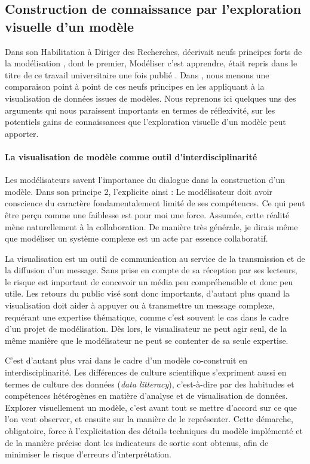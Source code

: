 \subsection{Construction de connaissance par l'exploration visuelle d'un modèle}

Dans son Habilitation à Diriger des Recherches,  décrivait neufs \og principes forts\fg{} de la modélisation \autocite[76--84]{banos_pour_2013}, dont le premier, \og Modéliser c'est apprendre\fg{}, était repris dans le titre de ce travail universitaire une fois publié \autocite{banos_modeliser_2016}.
Dans \textcite[\ppno~\hl{0--N}]{cura_visualisation_2020}, nous menons une comparaison point à point de ces neufs principes en les appliquant à la visualisation de données issues de modèles.
Nous reprenons ici quelques uns des arguments qui nous paraissent importants en termes de réflexivité, sur les potentiels gains de connaissances que l'exploration visuelle d'un modèle peut apporter.


\paragraph{La visualisation de modèle comme outil d'interdisciplinarité}
Les modélisateurs savent l’importance du dialogue dans la construction d’un modèle.
Dans son principe 2, \textcite[77]{banos_pour_2013} l’explicite ainsi :
	\og Le modélisateur doit avoir conscience du caractère fondamentalement limité de ses compétences.
	Ce qui peut être perçu comme une faiblesse est pour moi une force. Assumée, cette réalité mène naturellement à la collaboration.
	De manière très générale, je dirais même que modéliser un système complexe est un acte par essence collaboratif\fg{}.

\noindent La visualisation est un outil de communication au service de la transmission et de la diffusion d’un message.
Sans prise en compte de sa réception par ses lecteurs, le risque est important de concevoir un média peu compréhensible et donc peu utile.
Les retours du public visé sont donc importants, d’autant plus quand la visualisation doit aider à appuyer ou à transmettre un message complexe, requérant une expertise thématique, comme c’est souvent le cas dans le cadre d’un projet de modélisation.
Dès lors, le visualisateur ne peut agir seul, de la même manière que le modélisateur ne peut se contenter de sa seule expertise.

\noindent C'est d'autant plus vrai dans le cadre d'un modèle co-construit en interdisciplinarité.
Les différences de culture scientifique s'expriment aussi en termes de \og culture des données\fg{} (\textit{data litteracy}), c'est-à-dire par des habitudes et compétences hétérogènes en matière d'analyse et de visualisation de données.
Explorer visuellement un modèle, c'est avant tout se mettre d'accord sur ce que l'on veut observer, et ensuite sur la manière de le représenter.
Cette démarche, obligatoire, force à l'explicitation des détails techniques du modèle implémenté et de la manière précise dont les indicateurs de sortie sont obtenus, afin de minimiser le risque d'erreurs d'interprétation.

